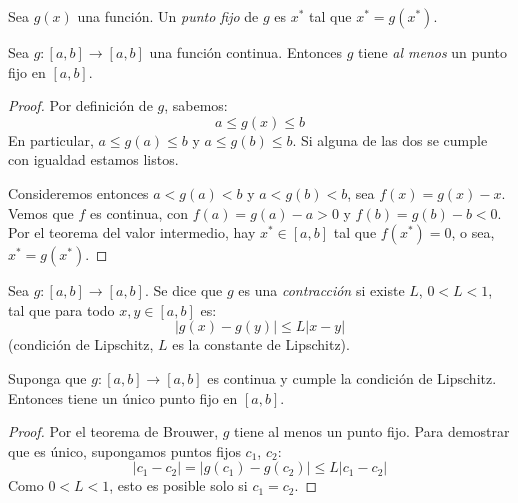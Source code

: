   \begin{definition}
    Sea \(g(x)\) una función.
    Un \emph{punto fijo} de \(g\) es \(x^*\) tal que \(x^* = g(x^*)\).
  \end{definition}
  \begin{theorem}
    Sea \(g \colon [a, b] \to [a, b]\) una función continua.
    Entonces \(g\) tiene \emph{al menos} un punto fijo en \([a, b]\).
  \end{theorem}
  \begin{proof}
    Por definición de \(g\),
    sabemos:
    \begin{equation*}
      a \le g(x) \le b
    \end{equation*}
    En particular,
    \(a \le g(a) \le b\) y \(a \le g(b) \le b\).
    Si alguna de las dos se cumple con igualdad estamos listos.

    Consideremos entonces \(a < g(a) < b\) y \(a < g(b) < b\),
    sea \(f(x) = g(x) - x\).
    Vemos que \(f\) es continua,
    con \(f(a) = g(a) - a > 0\)
    y \(f(b) = g(b) - b <0\).
    Por el teorema del valor intermedio,
    hay \(x^* \in [a, b]\) tal que \(f(x^*) = 0\),
    o sea, \(x^* = g(x^*)\).
  \end{proof}
  \begin{definition}
    Sea \(g \colon [a, b] \to [a, b]\).
    Se dice que \(g\) es una \emph{contracción}
    si existe \(L\), \(0 < L < 1\),
    tal que para todo \(x, y \in [a, b]\) es:
    \begin{equation}
      \lvert g(x) - g(y) \rvert
        \le L \lvert x - y \rvert
    \end{equation}
    (condición de Lipschitz,
     \(L\) es la constante de Lipschitz).
  \end{definition}
  \begin{theorem}
    Suponga que \(g \colon [a, b] \to [a, b]\) es continua
    y cumple la condición de Lipschitz.
    Entonces tiene un único punto fijo en \([a, b]\).
  \end{theorem}
  \begin{proof}
    Por el teorema de Brouwer,
    \(g\) tiene al menos un punto fijo.
    Para demostrar que es único,
    supongamos puntos fijos \(c_1\), \(c_2\):
    \begin{equation}
      \lvert c_1 - c_2 \rvert
        =   \lvert g(c_1) - g(c_2) \rvert
        \le L \lvert c_1 - c_2 \rvert
    \end{equation}
    Como \(0 < L < 1\),
    esto es posible solo si \(c_1 = c_2\).
  \end{proof}
